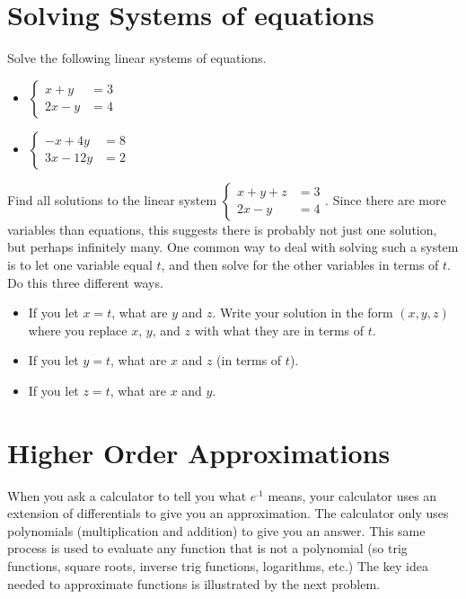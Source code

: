 \section{Solving Systems of equations}


\begin{problem}
Solve the following linear systems of equations.
\begin{itemize}
\item $\begin{cases}x+y&=3\\2x-y&=4\end{cases}$
\item $\begin{cases}-x + 4y&=8\\3x - 12y&=2\end{cases}$
\end{itemize}
\end{problem}

\begin{problem}
Find all solutions to the linear system 
$\begin{cases}x+y+z&=3\\2x-y&=4\end{cases}$.  
Since there are more variables than equations, this suggests there is probably not just one solution, but perhaps infinitely many.  One common way to deal with solving such a system is to let one variable equal $t$, and then solve for the other variables in terms of $t$. Do this three different ways.
\begin{itemize}
\item If you let $x=t$, what are $y$ and $z$.  Write your solution in the form $(x,y,z)$ where you replace $x$, $y$, and $z$ with what they are in terms of $t$.
\item If you let $y=t$, what are $x$ and $z$ (in terms of $t$).
\item If you let $z=t$, what are $x$ and $y$.
\end{itemize}
\end{problem}


\section{Higher Order Approximations} 
When you ask a calculator to tell you what $e^{.1}$ means, your calculator uses an extension of differentials to give you an approximation.  The calculator only uses polynomials (multiplication and addition) to give you an answer.  This same process is used to evaluate any function that is not a polynomial (so trig functions, square roots, inverse trig functions, logarithms, etc.) 
The key idea needed to approximate functions is illustrated by the next problem.

